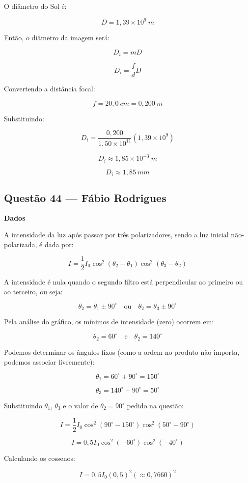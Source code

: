 \documentclass[12pt,a4paper]{article}
\begin{document}
O diâmetro do Sol é:

\[
D=1,39\times10^{9}\ m
\]

Então, o diâmetro da imagem será:

\[
D_i=mD
\]

\[
D_i=\frac{f}{d}D
\]

Convertendo a distância focal:

\[
f=20,0\ cm=0,200\ m
\]

Substituindo:

\[
D_i=
\frac{0,200}{1,50\times10^{11}}
(1,39\times10^{9})
\]

\[
D_i\approx1,85\times10^{-3}\ m
\]

\[
D_i\approx1,85\ mm
\]


\subsection{Questão 44 — Fábio Rodrigues}
\textbf{Dados}

A intensidade da luz após passar por três polarizadores, sendo a luz inicial não-polarizada, é dada por:

\[
I = \frac{1}{2} I_0 \cos^2(\theta_2 - \theta_1) \cos^2(\theta_3 - \theta_2)
\]

A intensidade é nula quando o segundo filtro está perpendicular ao primeiro ou ao terceiro, ou seja:

\[
\theta_2 = \theta_1 \pm 90^\circ \quad \text{ou} \quad \theta_2 = \theta_3 \pm 90^\circ
\]

Pela análise do gráfico, os mínimos de intensidade (zero) ocorrem em:

\[
\theta_2 = 60^\circ \quad \text{e} \quad \theta_2 = 140^\circ
\]

Podemos determinar os ângulos fixos (como a ordem no produto não importa, podemos associar livremente):

\[
\theta_1 = 60^\circ + 90^\circ = 150^\circ
\]

\[
\theta_3 = 140^\circ - 90^\circ = 50^\circ
\]

Substituindo \(\theta_1\), \(\theta_3\) e o valor de \(\theta_2 = 90^\circ\) pedido na questão:

\[
I = \frac{1}{2} I_0 \cos^2(90^\circ - 150^\circ) \cos^2(50^\circ - 90^\circ)
\]

\[
I = 0,5 I_0 \cos^2(-60^\circ) \cos^2(-40^\circ)
\]

Calculando os cossenos:

\[
I = 0,5 I_0 (0,5)^2 (\approx 0,7660)^2
\]
\end{document}
